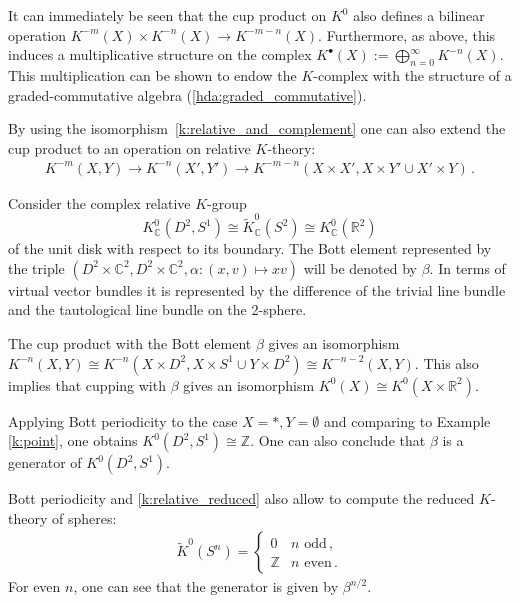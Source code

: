 {    \begin{property}
        It can immediately be seen that the cup product on $K^0$ also defines a bilinear operation $K^{-m}(X)\times K^{-n}(X)\rightarrow K^{-m-n}(X)$. Furthermore, as above, this induces a multiplicative structure on the complex $K^\bullet(X):=\bigoplus_{n=0}^\infty K^{-n}(X)$. This multiplication can be shown to endow the $K$-complex with the structure of a graded-commutative algebra (\cref{hda:graded_commutative}).

        By using the isomorphism~\eqref{k:relative_and_complement} one can also extend the cup product to an operation on relative $K$-theory:
        \begin{gather}
            K^{-m}(X,Y)\rightarrow K^{-n}(X',Y')\rightarrow K^{-m-n}(X\times X',X\times Y'\cup X'\times Y)\,.
        \end{gather}
    \end{property}

    \begin{notation}
        Consider the complex relative $K$-group \[K^0_{\mathbb{C}}(D^2,S^1)\cong\widetilde{K}^0_{\mathbb{C}}(S^2)\cong K^0_{\mathbb{C}}(\mathbb{R}^2)\] of the unit disk with respect to its boundary. The Bott element represented by the triple $\left(D^2\times\mathbb{C}^2,D^2\times\mathbb{C}^2,\alpha:(x,v)\mapsto xv\right)$ will be denoted by $\beta$. In terms of virtual vector bundles it is represented by the difference of the trivial line bundle and the tautological line bundle on the 2-sphere.
    \end{notation}
    \begin{theorem}
        The cup product with the Bott element $\beta$ gives an isomorphism $K^{-n}(X,Y)\cong K^{-n}(X\times D^2,X\times S^1\cup Y\times D^2)\cong K^{-n-2}(X,Y)$. This also implies that cupping with $\beta$ gives an isomorphism $K^0(X)\cong K^0(X\times\mathbb{R}^2)$.
    \end{theorem}
    \begin{result}
        Applying Bott periodicity to the case $X=\ast,Y=\emptyset$ and comparing to Example \ref{k:point}, one obtains $K^0(D^2,S^1)\cong\mathbb{Z}$. One can also conclude that $\beta$ is a generator of $K^0(D^2,S^1)$.
    \end{result}
    \begin{result}[Spheres]
        Bott periodicity and \cref{k:relative_reduced} also allow to compute the reduced $K$-theory of spheres:
        \begin{gather}
            \widetilde{K}^0(S^n) =
            \begin{cases}
                0&n\text{ odd}\,,\\
                \mathbb{Z}&n\text{ even}\,.
            \end{cases}
        \end{gather}
        For even $n$, one can see that the generator is given by $\beta^{n/2}$.
    \end{result}

}
